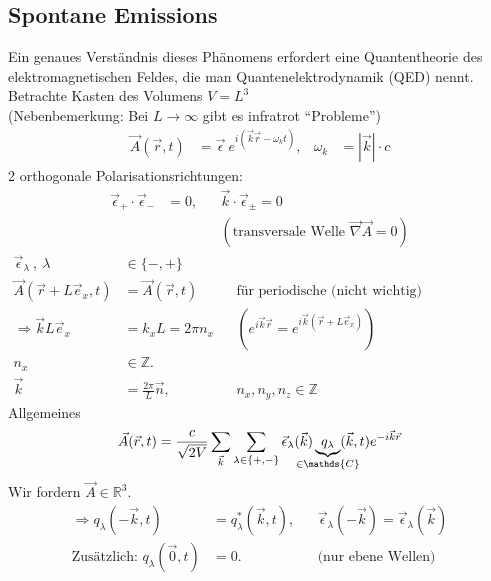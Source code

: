 \subsection{Spontane Emissions}
	Ein genaues Verständnis dieses Phänomens erfordert eine Quantentheorie des elektromagnetischen Feldes, die man Quantenelektrodynamik (QED) nennt. 
	\\
		
	Betrachte Kasten des Volumens $V = L^3$ \\	
	(Nebenbemerkung: Bei $L \rightarrow \infty$ gibt es infratrot ``Probleme'')
		\begin{align*}
			\vec{A} (\vec{r} , t) &= \vec{\epsilon}~ e^{i (\vec{k} \vec{r} - \omega_k t)} 
			,& \omega_k &= |\vec{k}| \cdot c 
		\end{align*}
	2 orthogonale Polarisationsrichtungen: 
		\begin{align*}
			\vec{\epsilon}_+ \cdot \vec{\epsilon}_- &= 0 
			,& &\vec{k} \cdot \vec{\epsilon}_\pm = 0 \\
			& & &(\text{transversale Welle~} \vec{\nabla} \vec{A} = 0 )
 		\end{align*}
 		\begin{align*}
	 		\vec{\epsilon}_\lambda ~,~ \lambda &\in \{ - , + \} \\
	 		\vec{A} (\vec{r} + L \vec{e}_x , t) &= \vec{A} (\vec{r} , t) &
	 		&\text{für periodische (nicht wichtig) Randbedingungen.} \\
	 		\Rightarrow \vec{k} L \vec{e}_x &= k_x L = 2 \pi n_x &
	 		&\left( e^{i \vec{k} \vec{r}} = e^{i \vec{k} (\vec{r} + L \vec{e}_x)} \right) \\
	 		n_x &\in \mathds{Z}. \\
	 		\vec{k} &= \frac{2 \pi}{L} \vec{n} ,& &n_x, n_y, n_z \in \mathds{Z}
 		\end{align*}
 	Allgemeines
	 	\begin{align*}
		 	\vec{A} (\vec{r} , t) = \frac{c}{\sqrt{2 V}}
		 	\sum_{\vec{k}} \sum_{\lambda \in \{+ , - \} }
		 	\vec{\epsilon}_\lambda (\vec{k}) 
		 	\underbrace{q_\lambda}_{\mathclap{\in \mathds{C}}} (\vec{k} , t) 
		 	e^{-i \vec{k} \vec{r}}
	 	\end{align*}
	Wir fordern $\vec{A} \in \mathds{R}^3$.
		\begin{align*}
			\Rightarrow q_\lambda (- \vec{k} , t) &= q^*_\lambda (\vec{k} , t) ,&
			&\vec{\epsilon}_\lambda (-\vec{k}) = \vec{\epsilon}_\lambda (\vec{k}) \\
			\text{Zusätzlich:~} q_\lambda (\vec{0} , t) &= 0 .& 
			&\text{(nur ebene Wellen)}
		\end{align*}
